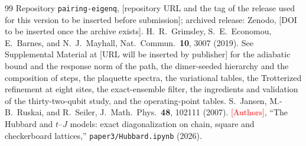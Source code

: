 \documentclass[a4paper,11pt,noarxiv]{quantumarticle}
\newcommand{\todo}[1]{\textcolor{red}{[#1]}}
\begin{document}
\begin{thebibliography}{99}
 Repository \texttt{pairing-eigenq}, [repository URL and the
tag of the release used for this version to be inserted before submission];
archived release: Zenodo, [DOI to be inserted once the archive exists].
 H.~R.~Grimsley, S.~E.~Economou, E.~Barnes, and
N.~J.~Mayhall, Nat.\ Commun.\ \textbf{10}, 3007 (2019).
 See Supplemental Material at [URL will be inserted by
publisher] for the adiabatic bound and the response norm of the path, the
dimer-seeded hierarchy and the composition of steps, the plaquette spectra,
the variational tables, the Trotterized refinement at eight sites, the
exact-ensemble filter, the ingredients and validation of the thirty-two-qubit
study, and the operating-point tables.
 S.~Jansen, M.-B.~Ruskai, and R.~Seiler, J.~Math.\ Phys.\
\textbf{48}, 102111 (2007).
 \todo{Authors}, ``The Hubbard and $t$--$J$ models:
exact diagonalization on chain, square and checkerboard lattices,''
\texttt{paper3/Hubbard.ipynb} (2026).
\end{thebibliography}
\end{document}
